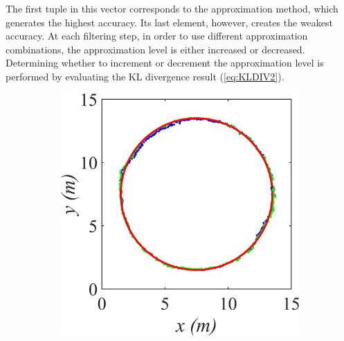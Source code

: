 The first tuple in this vector corresponds to the approximation method, which generates the highest accuracy. Its last element, however, creates the weakest accuracy.
At each filtering step, in order to use different approximation combinations, the approximation level is either increased or decreased. Determining whether to increment or decrement the approximation level is performed by evaluating the KL divergence result (\ref{eq:KLDIV2}).


\begin{figure}
    \centering
    \begin{subfigure}[tb]{0.2\textwidth}
        \includegraphics[width=\textwidth]{img/KL_0_5.png}
        \caption{}
    \end{subfigure}
    \begin{subfigure}[tb]{0.2\textwidth}

\end{subfigure}
\end{figure}
